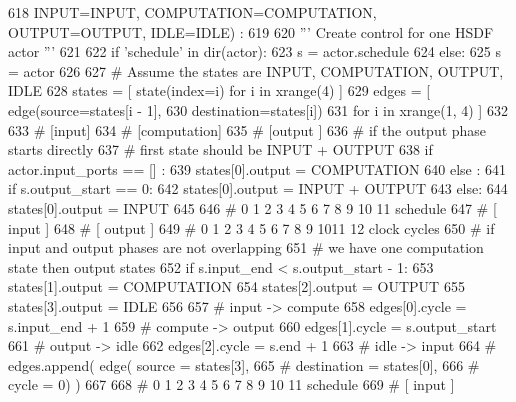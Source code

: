 \begin{DoxyCode}
618     INPUT=INPUT, COMPUTATION=COMPUTATION, OUTPUT=OUTPUT, IDLE=IDLE) :
619 
620     \textcolor{stringliteral}{''' Create control for one HSDF actor '''}
621 
622     \textcolor{keywordflow}{if} \textcolor{stringliteral}{'schedule'} \textcolor{keywordflow}{in} dir(actor):
623       s = actor.schedule
624     \textcolor{keywordflow}{else}:
625       s = actor
626 
627     \textcolor{comment}{# Assume the states are INPUT, COMPUTATION, OUTPUT, IDLE}
628     states = [ state(index=i) \textcolor{keywordflow}{for} i \textcolor{keywordflow}{in} xrange(4) ]
629     edges = [ edge(source=states[i - 1],
630                    destination=states[i])
631               \textcolor{keywordflow}{for} i \textcolor{keywordflow}{in} xrange(1, 4) ]
632 
633     \textcolor{comment}{# [input]}
634     \textcolor{comment}{# [computation]}
635     \textcolor{comment}{# [output     ]}
636     \textcolor{comment}{# if the output phase starts directly}
637     \textcolor{comment}{# first state should be INPUT + OUTPUT}
638     \textcolor{keywordflow}{if} actor.input\_ports == [] :
639       states[0].output = COMPUTATION
640     \textcolor{keywordflow}{else} :
641       \textcolor{keywordflow}{if} s.output\_start == 0:
642         states[0].output = INPUT + OUTPUT
643       \textcolor{keywordflow}{else}:
644         states[0].output = INPUT
645 
646     \textcolor{comment}{#   0 1 2 3 4 5 6 7 8 9 10 11 schedule}
647     \textcolor{comment}{#   [ input  ]}
648     \textcolor{comment}{#               [ output ]}
649     \textcolor{comment}{# 0 1 2 3 4 5 6 7 8 9 1011 12 clock cycles}
650     \textcolor{comment}{# if input and output phases are not overlapping}
651     \textcolor{comment}{# we have one computation state then output states}
652     \textcolor{keywordflow}{if} s.input\_end < s.output\_start - 1:
653       states[1].output = COMPUTATION
654       states[2].output = OUTPUT
655       states[3].output = IDLE
656 
657       \textcolor{comment}{# input -> compute}
658       edges[0].cycle = s.input\_end + 1
659       \textcolor{comment}{# compute -> output}
660       edges[1].cycle = s.output\_start
661       \textcolor{comment}{# output -> idle}
662       edges[2].cycle = s.end + 1
663       \textcolor{comment}{# idle -> input}
664       \textcolor{comment}{# edges.append( edge( source = states[3],}
665       \textcolor{comment}{#                     destination = states[0],}
666       \textcolor{comment}{#                     cycle = 0) )}
667 
668     \textcolor{comment}{#   0 1 2 3 4 5 6 7 8 9 10 11 schedule}
669     \textcolor{comment}{#   [ input  ]}

\end{DoxyCode}

